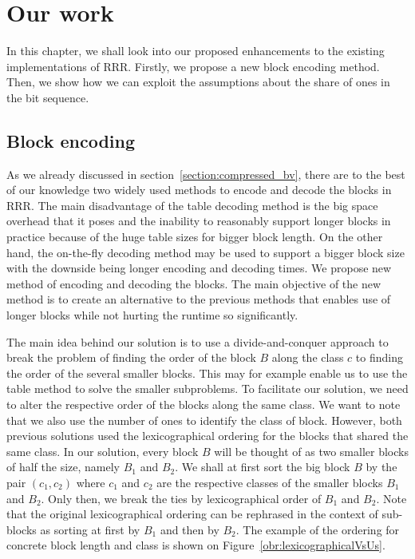 \chapter{Our work}
\label{kap:kap3}

In this chapter, we shall look into our proposed enhancements to the existing
implementations of RRR. Firstly, we propose a new block encoding method.
Then, we show how we can exploit the assumptions about the share of ones
in the bit sequence.

\section{Block encoding}

As we already discussed in section~\ref{section:compressed_bv}, there are to
the best of our knowledge two widely used methods to encode and decode the
blocks in RRR. The main disadvantage of the table decoding method is the big space
overhead that it poses and the inability to reasonably support longer blocks
in practice because of the huge table sizes for bigger block length. On the
other hand, the on-the-fly decoding method may be used to support a bigger block size
with the downside being longer encoding and decoding times. We propose
new method of encoding and decoding the blocks. The main objective of the new method is
to create an alternative to the previous methods that enables use of longer blocks
while not hurting the runtime so significantly.

The main idea behind our solution is to use a divide-and-conquer approach to break
the problem of finding the order of the block $B$ along the class $c$ to finding the order
of the several smaller blocks. This may for example enable us to use the table method to solve the
smaller subproblems. To facilitate our solution, we need to alter the respective order of
the blocks along the same class. We want to note that we also use the number of ones to
identify the class of block. However, both previous solutions used the lexicographical ordering
for the blocks that shared the same class. In our solution, every block $B$ will be thought
of as two smaller blocks of half the size, namely $B_1$ and $B_2$. We shall at first sort the
big block $B$ by the pair $(c_1, c_2)$ where $c_1$ and $c_2$ are the respective classes of the
smaller blocks $B_1$ and $B_2$. Only then, we break the ties by lexicographical order of $B_1$ and $B_2$.
Note that the original lexicographical ordering can be rephrased in the context of sub-blocks as sorting
at first by $B_1$ and then by $B_2$. The example of the ordering for concrete block length
and class is shown on Figure~\ref{obr:lexicographicalVsUs}.

